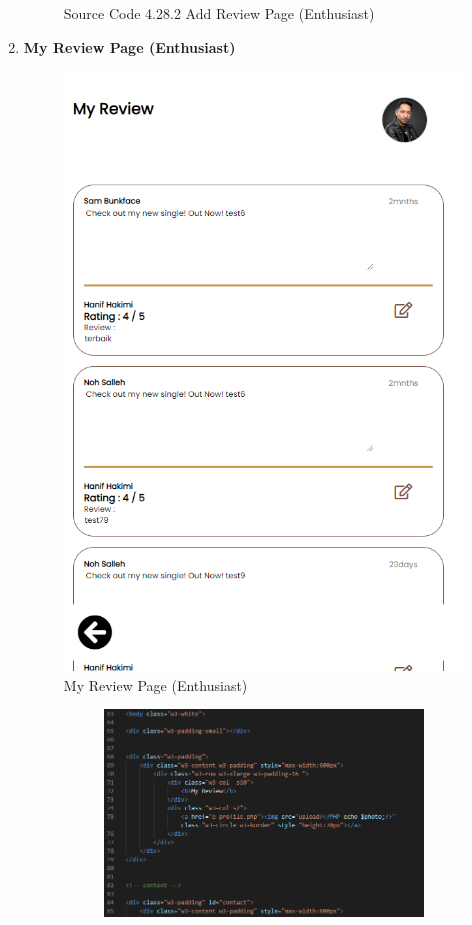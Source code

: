 \begin{enumerate}[1.]
\begin{figure}[h]
\begin{subfigure}[b]{0.7\textwidth}
            \label{fig:sub3}
        \end{subfigure}
        \caption*{Source Code 4.28.2 Add Review Page (Enthusiast)}
        \label{fig:myfig67b}
    \end{figure}

    \item \textbf{My Review Page (Enthusiast)}
    \begin{figure}[h]
        \centering
        \includegraphics[width=0.5\linewidth]{mainmatter/images/frontend/ss/My Review (Enthusiast).png}
        \caption{My Review Page (Enthusiast)}
        \label{fig:myfig68}
    \end{figure}
    \begin{figure}[h]\ContinuedFloat
        \centering
        \begin{subfigure}[b]{0.7\textwidth}
            \centering
            \includegraphics[width=\textwidth]{mainmatter/images/frontend/code/emyreview.png}

\end{subfigure}
\end{figure}
\end{enumerate}
